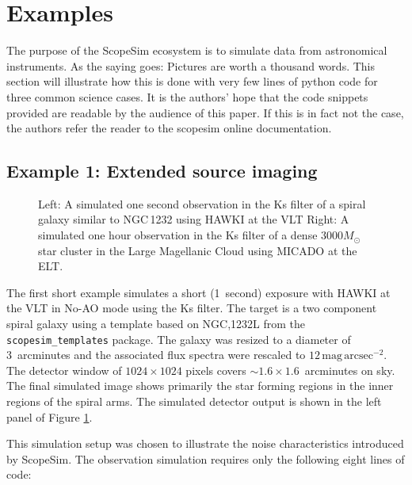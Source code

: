 

\section{Examples}
\label{examples}

The purpose of the ScopeSim ecosystem is to simulate data from astronomical instruments.
As the saying goes: Pictures are worth a thousand words.
This section will illustrate how this is done with very few lines of python code for three common science cases.
It is the authors' hope that the code snippets provided are readable by the audience of this paper.
If this is in fact not the case, the authors refer the reader to the scopesim online documentation.


\subsection{Example 1: Extended source imaging}
\label{example-1-extended-source-imaging}

\begin{figure}
\label{fig:combined_1_2}
\caption{Left: A simulated one second observation in the Ks filter of a spiral galaxy similar to NGC\,1232 using HAWKI at the VLT
Right: A simulated one hour observation in the Ks filter of a dense $3000 M_{\odot}$ star cluster in the Large Magellanic Cloud using MICADO at the ELT.}
\end{figure}

The first short example simulates a short (1~second) exposure with HAWKI \cite{hawki} at the VLT in No-AO mode using the Ks filter.
The target is a two component spiral galaxy using a template based on NGC,1232L from the \lstinline{scopesim_templates} package.
The galaxy was resized to a diameter of 3~arcminutes and the associated flux spectra\cite{brown2014} were rescaled to $12\,\mathrm{mag\,arcsec^{-2}}$.
The detector window of $1024 \times 1024$ pixels covers $\sim 1.6 \times 1.6$~arcminutes on sky.
The final simulated image shows primarily the star forming regions in the inner regions of the spiral arms.
The simulated detector output is shown in the left panel of Figure \ref{fig:combined_1_2}.

This simulation setup was chosen to illustrate the noise characteristics introduced by ScopeSim.
The observation simulation requires only the following eight lines of code:

